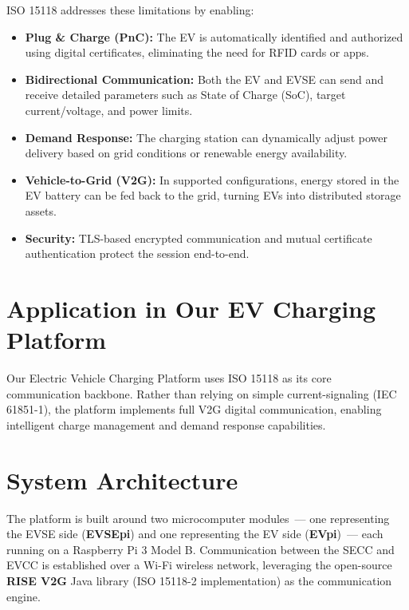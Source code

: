 \documentclass[12pt,a4paper]{report}
\begin{document}
ISO 15118 addresses these limitations by enabling:

\begin{itemize}
  \item \textbf{Plug \& Charge (PnC):} The EV is automatically identified and authorized using
        digital certificates, eliminating the need for RFID cards or apps.

  \item \textbf{Bidirectional Communication:} Both the EV and EVSE can send and receive
        detailed parameters such as State of Charge (SoC), target current/voltage, and power
        limits.

  \item \textbf{Demand Response:} The charging station can dynamically adjust power delivery
        based on grid conditions or renewable energy availability.

  \item \textbf{Vehicle-to-Grid (V2G):} In supported configurations, energy stored in the EV
        battery can be fed back to the grid, turning EVs into distributed storage assets.

  \item \textbf{Security:} TLS-based encrypted communication and mutual certificate
        authentication protect the session end-to-end.
\end{itemize}

\section{Application in Our EV Charging Platform}

Our Electric Vehicle Charging Platform uses ISO 15118 as its core communication backbone.
Rather than relying on simple current-signaling (IEC 61851-1), the platform implements full
V2G digital communication, enabling intelligent charge management and demand response
capabilities.

\section{System Architecture}

The platform is built around two microcomputer modules~--- one representing the EVSE side
(\textbf{EVSEpi}) and one representing the EV side (\textbf{EVpi})~--- each running on a
Raspberry Pi 3 Model B. Communication between the SECC and EVCC is established over a Wi-Fi
wireless network, leveraging the open-source \textbf{RISE V2G} Java library (ISO 15118-2
implementation) as the communication engine.
\end{document}
